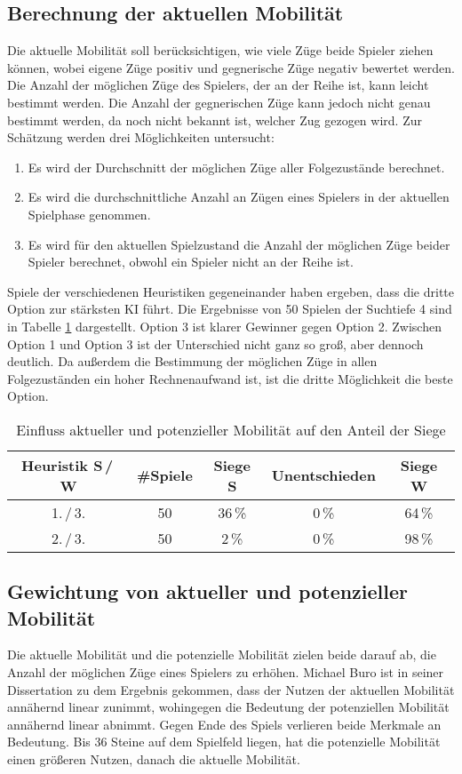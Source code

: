 \subsection{Berechnung der aktuellen Mobilität}
\label{sec:currentmobility}
Die aktuelle Mobilität soll berücksichtigen, wie viele Züge beide Spieler ziehen können, wobei eigene Züge positiv und
gegnerische Züge negativ bewertet werden. Die Anzahl der möglichen Züge des Spielers, der an der Reihe ist, kann leicht bestimmt
werden. Die Anzahl der gegnerischen Züge kann jedoch nicht genau bestimmt werden, da noch nicht bekannt ist, welcher Zug
gezogen wird. Zur Schätzung werden drei Möglichkeiten untersucht:
\begin{enumerate}
    \item Es wird der Durchschnitt der möglichen Züge aller Folgezustände berechnet.
    \item Es wird die durchschnittliche Anzahl an Zügen eines Spielers in der aktuellen Spielphase genommen.
    \item Es wird für den aktuellen Spielzustand die Anzahl der möglichen Züge beider Spieler berechnet, obwohl ein
    Spieler nicht an der Reihe ist.
\end{enumerate}
Spiele der verschiedenen Heuristiken gegeneinander haben ergeben, dass die dritte Option zur stärksten \ac{KI} führt. Die
Ergebnisse von 50 Spielen der Suchtiefe 4 sind in Tabelle \ref{table:currentmobility} dargestellt. Option 3 ist klarer
Gewinner gegen Option 2. Zwischen Option 1 und Option 3 ist der Unterschied nicht ganz so groß, aber dennoch deutlich.
Da außerdem die Bestimmung der möglichen Züge in allen Folgezuständen ein hoher Rechnenaufwand ist, ist die dritte Möglichkeit
die beste Option.

\begin{table}[hb]
\centering
\begin{tabular}{c|c|ccc}
\hline
Heuristik S\,/\,W & \#Spiele & Siege S & Unentschieden & Siege W \\
\hline
 1.\,/\,3. & 50 & 36\,\% &  0\,\% & 64\,\% \\
 2.\,/\,3. & 50 &  2\,\% &  0\,\% & 98\,\% \\
\hline
\end{tabular}
\caption{Einfluss aktueller und potenzieller Mobilität auf den Anteil der Siege}
\label{table:currentmobility}
\end{table}

\subsection{Gewichtung von aktueller und potenzieller Mobilität}
\label{sec:combinedmobility}
Die aktuelle Mobilität und die potenzielle Mobilität zielen beide darauf ab, die Anzahl der möglichen Züge eines
Spielers zu erhöhen. Michael Buro ist in seiner Dissertation zu dem Ergebnis gekommen, dass der Nutzen der aktuellen
Mobilität annähernd linear zunimmt, wohingegen die Bedeutung der potenziellen Mobilität annähernd linear abnimmt. Gegen Ende des Spiels
verlieren beide Merkmale an Bedeutung. Bis 36 Steine auf dem Spielfeld liegen, hat die potenzielle Mobilität einen
größeren Nutzen, danach die aktuelle Mobilität. \cite[S.~20]{evaluationfunctions}


